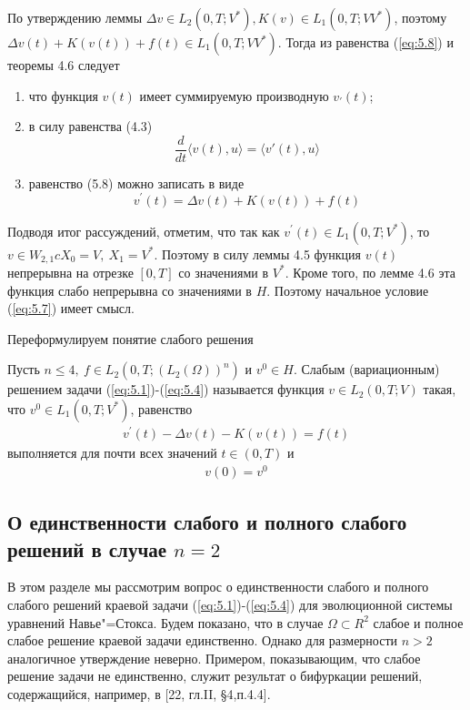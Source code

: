 По утверждению леммы $\Delta v \in L_2(0, T; V^\ast), K(v) \in L_1(0, T; VV^\ast)$, поэтому $\Delta v(t) + K(v(t)) + f(t) \in L_1(0, T; VV^\ast)$.
Тогда из равенства (\ref{eq:5.8}) и теоремы 4.6 следует
\begin{enumerate}
    \item что функция $v(t)$ имеет суммируемую производную $v_\prime(t)$;
    \item в силу равенства (4.3)
    $$\frac{d}{dt} \langle v(t), u \rangle = \langle v'(t), u \rangle $$
    \item равенство (5.8) можно записать в виде
    $$v^\prime(t)=\Delta v(t)+K(v(t))+f(t)$$
\end{enumerate}

Подводя итог рассуждений, отметим, что так как $v^\prime(t) \in L_1(0, T; V^\ast)$, то $v \in W_{2, 1} c X_0 = V, \ X_1 = V^\ast$. Поэтому в силу леммы 4.5 функция
$v(t)$ непрерывна на отрезке $[0, T]$ со значениями в $V^\ast$. Кроме того, по лемме 4.6 эта функция слабо непрерывна со значениями в $H$. Поэтому
начальное условие (\ref{eq:5.7}) имеет смысл.

Переформулируем понятие слабого решения
\begin{definition}
    Пусть $n \le 4, \ f \in L_2(0, T; (L_2(\Omega))^n)$ и $v^0 \in H$. Слабым (вариационным) решением задачи (\ref{eq:5.1})-(\ref{eq:5.4}) называется функция
    $v \in L_2(0, T; V)$ такая, что $v^0 \in L_1(0, T; V^\ast)$, равенство
    \begin{equation}\label{eq:5.11}
        \begin{gathered}
            v^\prime(t) - \Delta v(t) - K(v(t)) = f(t)
        \end{gathered}
    \end{equation}
    выполняется для почти всех значений $t \in (0, T)$ и
    \begin{equation}\label{eq:5.12}
        \begin{gathered}
            v(0) = v^0
        \end{gathered}
    \end{equation}
\end{definition}


\subsection {О единственности слабого и полного слабого решений в случае $n = 2$}
В этом разделе мы рассмотрим вопрос о единственности слабого и полного слабого решений краевой задачи (\ref{eq:5.1})-(\ref{eq:5.4}) для эволюционной
системы уравнений Навье"=Стокса. Будем показано, что в случае $\Omega \subset R^2$ слабое и полное слабое решение краевой задачи единственно.
Однако для размерности $n > 2$ аналогичное утверждение неверно. Примером, показывающим, что слабое решение задачи не единственно, служит результат
о бифуркации решений, содержащийся, например, в [22, гл.II, \S 4,п.4.4].


